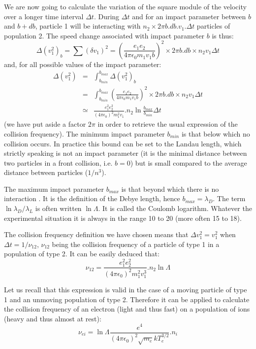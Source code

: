 We are now going to calculate the variation of the square module of the velocity over a longer time interval  $\Delta t$. During $\Delta t$ and for an impact parameter between $b$ and $b+db$, particle 1 will be interacting with $n_2 \times 2\pi b.db.v_1.\Delta t$ particles of population 2. The speed change associated with impact parameter $b$ is thus:
\[
		\Delta (v_1^2)_b = \sum{(\delta v_1)^2} = \left( \frac{e_1 e_2}{4\pi\epsilon_0 m_1 v_1 b} \right)^2 \times 2\pi b.db\times n_2 v_1 \Delta t
\]
and, for all possible values of the impact parameter:
\begin{eqnarray}
		\Delta (v_1^2) 	&	=	&	\int_{b_{min}}^{b_{max}} \Delta (v_1^2)_b \nonumber\\
										& = &	\int_{b_{min}}^{b_{max}} \left( \frac{e_1 e_2}{4\pi\epsilon_0 m_1 v_1 b} \right)^2 \times 2\pi b.db\times n_2 v_1 \Delta t	\nonumber	\\
										& \simeq &	\frac{e_1^2 e_2^2}{\left( 4\pi\epsilon_0 \right)^2 m_1^2 v_1}.n_2\ln{\frac{b_{max}}{b_{min}}}\Delta t
\end{eqnarray}
(we have put aside a factor $2\pi$ in order to retrieve the usual expression of the collision frequency). The minimum impact parameter $b_{min}$ is that below which no collision occurs. In practice this bound can be set to the Landau length, which strictly speaking is not an impact parameter (it is the minimal distance between two particles in a front collision, i.e. $b = 0$) but is small compared to the average distance between particles ($1/n^3$).

The maximum impact parameter $b_{max}$ is that beyond which there is no interaction . It is the definition of the Debye length, hence $b_{max} = \lambda_D$. The term $\ln{\lambda_D/\lambda_L}$ is often written $\ln \Lambda$. It is called the Coulomb logarithm. Whatever the experimental situation it is always in the range 10 to 20 (more often 15 to 18).

The collision frequency definition we have chosen means that $\Delta v_1^2 = v_1^2$ when $\Delta t = 1/\nu_{12}$, $\nu_{12}$ being the collision frequency of a particle of type 1 in a population of type 2. It can be easily deduced that: 
\begin{equation}
		\nu_{12} = \frac{e_1^2 e_2^2}{\left( 4\pi\epsilon_0 \right)^2 m_1^2 v_1^3}.n_2\ln{\Lambda}
\end{equation}

Let us recall that this expression is valid in the case of a moving particle of type 1 and an unmoving population of type 2. Therefore it can be applied to calculate the collision frequency of an electron (light and thus fast) on a population of ions (heavy and thus almost at rest):
\[
		\nu_{ei} = \ln{\Lambda} \frac{e^4}{\left( 4\pi\epsilon_0 \right)^2 \sqrt{m_e} kT_e^{3/2}}.n_i
\]

